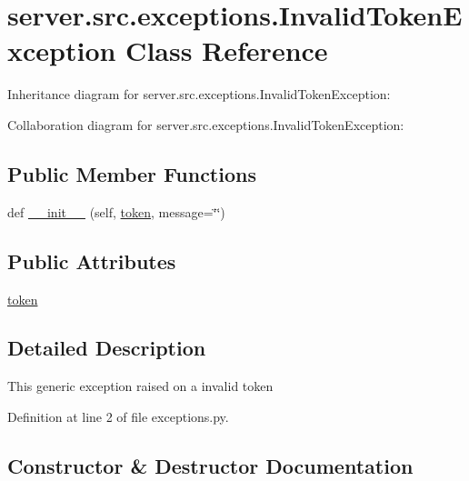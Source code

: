 \hypertarget{classserver_1_1src_1_1exceptions_1_1_invalid_token_exception}{}\section{server.\+src.\+exceptions.\+Invalid\+Token\+Exception Class Reference}
\label{classserver_1_1src_1_1exceptions_1_1_invalid_token_exception}


Inheritance diagram for server.\+src.\+exceptions.\+Invalid\+Token\+Exception\+:


Collaboration diagram for server.\+src.\+exceptions.\+Invalid\+Token\+Exception\+:
\subsection*{Public Member Functions}
\begin{DoxyCompactItemize}
\item 
def \hyperlink{classserver_1_1src_1_1exceptions_1_1_invalid_token_exception_a6702e135444b0448d0a906242bb0dfb9}{\+\_\+\+\_\+init\+\_\+\+\_\+} (self, \hyperlink{classserver_1_1src_1_1exceptions_1_1_invalid_token_exception_a55c9f26dd8ec500cd9f49be460f45379}{token}, message=\char`\"{}\char`\"{})
\end{DoxyCompactItemize}
\subsection*{Public Attributes}
\begin{DoxyCompactItemize}
\item 
\hyperlink{classserver_1_1src_1_1exceptions_1_1_invalid_token_exception_a55c9f26dd8ec500cd9f49be460f45379}{token}
\end{DoxyCompactItemize}


\subsection{Detailed Description}
\begin{DoxyVerb}This generic exception raised on a invalid token\end{DoxyVerb}
 

Definition at line 2 of file exceptions.\+py.



\subsection{Constructor \& Destructor Documentation}
